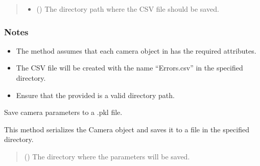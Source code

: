 \documentclass[letterpaper,10pt,english]{sphinxmanual}
\begin{document}
\begin{fulllineitems}
\begin{fulllineitems}
\begin{quote}
\begin{description}
\begin{itemize}
\begin{itemize}
\end{itemize}


\item {} 
\sphinxAtStartPar
{} () \textendash{} The directory path where the CSV file should be saved.

\end{itemize}

\end{description}\end{quote}
\subsubsection*{Notes}
\begin{itemize}
\item {} 
\sphinxAtStartPar
The method assumes that each camera object in  has the required attributes.

\item {} 
\sphinxAtStartPar
The CSV file will be created with the name “Errors.csv” in the specified directory.

\item {} 
\sphinxAtStartPar
Ensure that the  provided is a valid directory path.

\end{itemize}

\end{fulllineitems}


\begin{fulllineitems}
\label{\detokenize{CameraUtils:id23}}
\pysigstartsignatures
{}
\pysigstopsignatures
\sphinxAtStartPar
Save camera parameters to a .pkl file.

\sphinxAtStartPar
This method serializes the Camera object and saves it to a file in the
specified directory.
\begin{quote}\begin{description}
\sphinxAtStartPar
{} () \textendash{} The directory where the parameters will be saved.


\end{description}
\end{quote}
\end{fulllineitems}
\end{fulllineitems}
\end{document}
